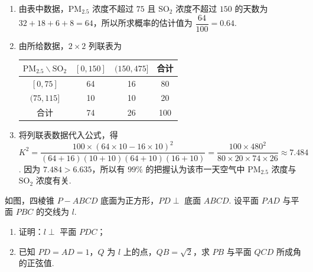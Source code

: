 \begin{solution}
\begin{enumerate}
\item 由表中数据，\(\mathrm{PM}_{2.5}\) 浓度不超过 \(75\) 且 \(\mathrm{SO}_2\) 浓度不超过 \(150\) 的天数为 \(32+18+6+8=64\)，所以所求概率的估计值为 \(\dfrac{64}{100}=0.64\).

\item 由所给数据，\(2\times2\) 列联表为
\begin{center}
\begin{tabular}{c|ccc}
\(\mathrm{PM}_{2.5}\backslash\mathrm{SO}_2\) & \([0,150]\) & \((150,475]\) & 合计 \\
\hline
\([0,75]\) & 64 & 16 & 80 \\
\((75,115]\) & 10 & 10 & 20 \\
合计 & 74 & 26 & 100
\end{tabular}
\end{center}

\item 将列联表数据代入公式，得 \(K^2=\dfrac{100\times(64\times10-16\times10)^2}{(64+16)(10+10)(64+10)(16+10)}=\dfrac{100\times480^2}{80\times20\times74\times26}\approx7.484\). 因为 \(7.484>6.635\)，所以有 \(99\%\) 的把握认为该市一天空气中 \(\mathrm{PM}_{2.5}\) 浓度与 \(\mathrm{SO}_2\) 浓度有关.
\end{enumerate}
\end{solution}

\begin{problem}
如图，四棱锥 \(P-ABCD\) 底面为正方形，\(PD\perp\) 底面 \(ABCD\). 设平面 \(PAD\) 与平面 \(PBC\) 的交线为 \(l\).

\begin{enumerate}
\item 证明：\(l\perp\) 平面 \(PDC\)；
\item 已知 \(PD=AD=1\)，\(Q\) 为 \(l\) 上的点，\(QB=\sqrt2\)，求 \(PB\) 与平面 \(QCD\) 所成角的正弦值.
\end{enumerate}

\end{problem}

